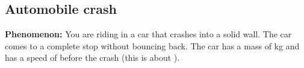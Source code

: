 \subsection{Automobile crash}
\label{act7.1.3A}


\noindent\textbf{Phenomenon:} You are riding in a car that crashes into a solid wall.  The car comes to a complete stop without bouncing back.  The car has a mass of \unit[1500]{kg} and has a speed of  before the crash (this is about ). 

\begin{fnt}
	
\end{fnt}

\begin{fnt}
	
\end{fnt}

\begin{fnt}
	
\end{fnt}

